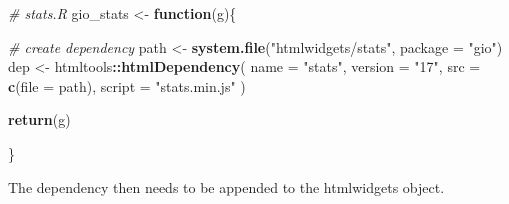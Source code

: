 \documentclass[
]{krantz}
\makeatletter
\newenvironment{Shaded}{\begin{snugshade}}{\end{snugshade}}
\newcommand{\CommentTok}[1]{\textcolor[rgb]{0.37,0.37,0.37}{\textit{#1}}}
\newcommand{\ControlFlowTok}[1]{\textcolor[rgb]{0.27,0.27,0.27}{\textbf{#1}}}
\newcommand{\DataTypeTok}[1]{\textcolor[rgb]{0.27,0.27,0.27}{#1}}
\newcommand{\KeywordTok}[1]{\textcolor[rgb]{0.27,0.27,0.27}{\textbf{#1}}}
\newcommand{\NormalTok}[1]{#1}
\newcommand{\OperatorTok}[1]{\textcolor[rgb]{0.43,0.43,0.43}{\textbf{#1}}}
\newcommand{\StringTok}[1]{\textcolor[rgb]{0.5,0.5,0.5}{#1}}
\newenvironment{kframe}{%
\medskip{}
\setlength{\fboxsep}{.8em}
 \def\at@end@of@kframe{}%
 \ifinner\ifhmode%
  \def\at@end@of@kframe{\end{minipage}}%
  \begin{minipage}{\columnwidth}%
 \fi\fi%
 \def\FrameCommand##1{\hskip\@totalleftmargin \hskip-\fboxsep
 \colorbox{shadecolor}{##1}\hskip-\fboxsep
     \hskip-\linewidth \hskip-\@totalleftmargin \hskip\columnwidth}%
 \MakeFramed {\advance\hsize-\width
   \@totalleftmargin\z@ \linewidth\hsize
   \@setminipage}}%
 {\par\unskip\endMakeFramed%
 \at@end@of@kframe}
\renewenvironment{Shaded}{\begin{kframe}}{\end{kframe}}
\makeatother
\begin{document}
\begin{Shaded}
\begin{Highlighting}[]
\CommentTok{\# stats.R}
\NormalTok{gio\_stats <{-}}\StringTok{ }\ControlFlowTok{function}\NormalTok{(g)\{}

  \CommentTok{\# create dependency}
\NormalTok{  path <{-}}\StringTok{ }\KeywordTok{system.file}\NormalTok{(}\StringTok{"htmlwidgets/stats"}\NormalTok{, }\DataTypeTok{package =} \StringTok{"gio"}\NormalTok{)}
\NormalTok{  dep <{-}}\StringTok{ }\NormalTok{htmltools}\OperatorTok{::}\KeywordTok{htmlDependency}\NormalTok{(}
    \DataTypeTok{name =} \StringTok{"stats"}\NormalTok{,}
    \DataTypeTok{version =} \StringTok{"17"}\NormalTok{,}
    \DataTypeTok{src =} \KeywordTok{c}\NormalTok{(}\DataTypeTok{file =}\NormalTok{ path),}
    \DataTypeTok{script =} \StringTok{"stats.min.js"}
\NormalTok{  )}

  \KeywordTok{return}\NormalTok{(g)}

\NormalTok{\}}
\end{Highlighting}
\end{Shaded}

The dependency then needs to be appended to the htmlwidgets object.

\begin{Shaded}
\end{Shaded}
\end{document}
